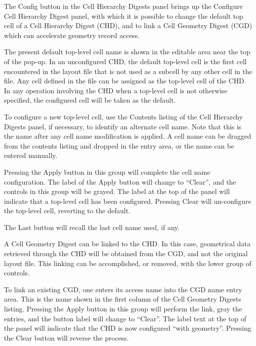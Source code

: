 The {\cb Config} button in the {\cb Cell Hierarchy Digests} panel
brings up the {\cb Configure Cell Hierarchy Digest} panel, with which
it is possible to change the default top cell of a Cell Hierarchy
Digest (CHD), and to link a Cell Geometry Digest (CGD) which can
accelerate geometry record access.

The present default top-level cell name is shown in the editable area
near the top of the pop-up.  In an unconfigured CHD, the default
top-level cell is the first cell encountered in the layout file that
is not used as a subcell by any other cell in the file.  Any cell
defined in the file can be assigned as the top-level cell of the CHD. 
In any operation involving the CHD when a top-level cell is not
otherwise specified, the configured cell will be taken as the default.

To configure a new top-level cell, use the {\cb Contents} listing of
the {\cb Cell Hierarchy Digests} panel, if necessary, to identify an
alternate cell name.  Note that this is the name after any cell name
modification is applied.  A cell name can be dragged from the contents
listing and dropped in the entry area, or the name can be entered
manually.

Pressing the {\cb Apply} button in this group will complete the cell
name configuration.  The label of the {\cb Apply} button will change
to ``{\vt Clear}'', and the controls in this group will be grayed. 
The label at the top of the panel will indicate that a top-level cell
has been configured.  Pressing {\cb Clear} will un-configure the
top-level cell, reverting to the default.

The {\cb Last} button will recall the last cell name used, if any.

A Cell Geometry Digest can be linked to the CHD.  In this case,
geometrical data retrieved through the CHD will be obtained from the
CGD, and not the original layout file.  This linking can be
accomplished, or removed, with the lower group of controls.

To link an existing CGD, one enters its access name into the {\cb CGD
name} entry area.  This is the name shown in the first column of the
{\cb Cell Geometry Digests} listing.  Pressing the {\cb Apply} button
in this group will perform the link, gray the entries, and the button
label will change to ``{\vt Clear}''.  The label text at the top of
the panel will indicate that the CHD is now configured ``with
geometry''.  Pressing the {\cb Clear} button will reverse the process.

